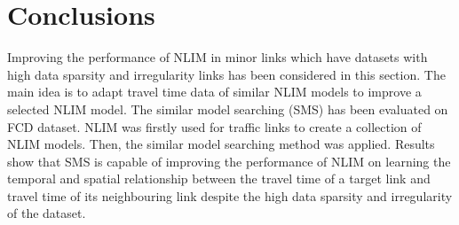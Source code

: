 \documentclass[journal]{IEEEtran}
\begin{document}
%






\section{Conclusions} 
\label{sec:conclusions}
Improving the performance of NLIM in minor links which have datasets with high data sparsity and irregularity links has been considered in this section. The main idea is to adapt travel time data of similar NLIM models to improve a selected NLIM model.
The similar model searching (SMS) has been evaluated on FCD dataset. NLIM was firstly used for traffic links to create a collection of NLIM models. Then, the similar model searching method was applied. Results show that SMS is capable of improving
the performance of NLIM on learning the temporal and spatial relationship between the travel time of a target link and travel time of its neighbouring link despite the high data sparsity and irregularity of the dataset.
\end{document}
